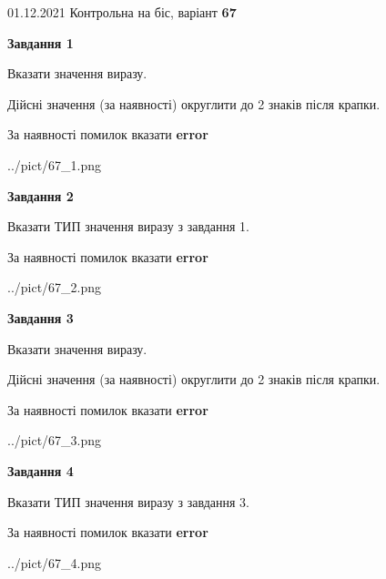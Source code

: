 \documentclass[11pt, ukrainian]{article}
\begin{document}
{01.12.2021 Контрольна на біс, варіант  \No \textbf { 67 }\par}
{
\begin {large}
{\begin {center}\textbf{Завдання 1}\end {center}}\par
Вказати значення виразу. \par
Дійсні значення (за наявності) округлити до 2 знаків після крапки. \par
За наявності помилок вказати \textbf{error}

\begin{center}
	{../pict/67_1.png}
\end{center}
\newpage

{\begin {center}\textbf{Завдання 2}\end {center}}\par
Вказати ТИП значення виразу з завдання 1. \par
За наявності помилок вказати \textbf{error}

\begin{center}
	{../pict/67_2.png}
\end{center}
\newpage

{\begin {center}\textbf{Завдання 3}\end {center}}\par
Вказати значення виразу. \par
Дійсні значення (за наявності) округлити до 2 знаків після крапки. \par
За наявності помилок вказати \textbf{error}

\begin{center}
	{../pict/67_3.png}
\end{center}
\newpage

{\begin {center}\textbf{Завдання 4}\end {center}}\par
Вказати ТИП значення виразу з завдання 3. \par
За наявності помилок вказати \textbf{error}

\begin{center}
	{../pict/67_4.png}
\end{center}
\newpage


\end{large}}
\end{document}
